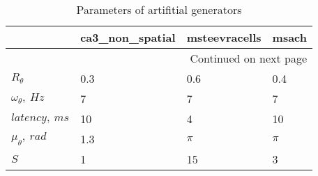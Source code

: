 \begin{longtable}{llll}
\caption{Parameters of artifitial generators}\label{ArtifitialCell_parameters}\\
\toprule
{} & ca3\_non\_spatial & msteevracells &    msach \\
\midrule
\endhead
\midrule
\multicolumn{4}{r}{{Continued on next page}} \\
\midrule
\endfoot

\bottomrule
\endlastfoot
$R_{\theta}$          &             0.3 &           0.6 &      0.4 \\
$\omega_{\theta},\ Hz$      &               7 &             7 &        7 \\
$latency,\ ms$    &              10 &             4 &       10 \\
$\mu_{\theta},\ rad$       &             1.3 &       $\pi$ &  $\pi$ \\
$S$ &               1 &            15 &        3 \\
\end{longtable}
